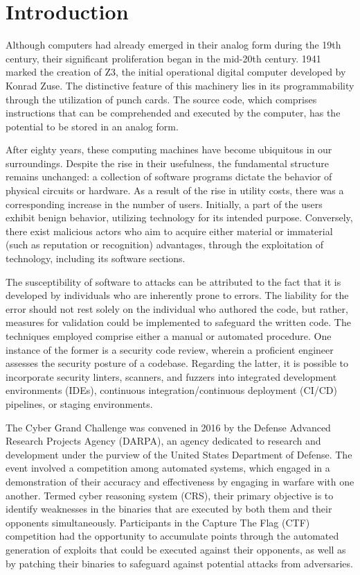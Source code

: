 \documentclass[../main.tex]{subfiles}
\begin{document}
\hypertarget{introduction}{%
\chapter{Introduction}\label{introduction}}

Although computers had already emerged in their analog form during the
19th century, their significant proliferation began in the mid-20th
century. 1941 marked the creation of Z3, the initial operational digital
computer developed by Konrad Zuse. The distinctive feature of this
machinery lies in its programmability through the utilization of punch
cards. The source code, which comprises instructions that can be
comprehended and executed by the computer, has the potential to be
stored in an analog form.

After eighty years, these computing machines have become ubiquitous in
our surroundings. Despite the rise in their usefulness, the fundamental
structure remains unchanged: a collection of software programs dictate
the behavior of physical circuits or hardware. As a result of the rise
in utility costs, there was a corresponding increase in the number of
users. Initially, a part of the users exhibit benign behavior, utilizing
technology for its intended purpose. Conversely, there exist malicious
actors who aim to acquire either material or immaterial (such as
reputation or recognition) advantages, through the exploitation of
technology, including its software sections.

The susceptibility of software to attacks can be attributed to the fact
that it is developed by individuals who are inherently prone to errors.
The liability for the error should not rest solely on the individual who
authored the code, but rather, measures for validation could be
implemented to safeguard the written code. The techniques employed
comprise either a manual or automated procedure. One instance of the
former is a security code review, wherein a proficient engineer assesses
the security posture of a codebase. Regarding the latter, it is possible
to incorporate security linters, scanners, and fuzzers into integrated
development environments (IDEs), continuous integration/continuous
deployment (CI/CD) pipelines, or staging environments.

The Cyber Grand Challenge was convened in 2016 by the Defense Advanced
Research Projects Agency (DARPA), an agency dedicated to research and
development under the purview of the United States Department of
Defense. The event involved a competition among automated systems, which
engaged in a demonstration of their accuracy and effectiveness by
engaging in warfare with one another. Termed cyber reasoning system (CRS),
their primary objective is to identify weaknesses in the binaries that
are executed by both them and their opponents simultaneously.
Participants in the Capture The Flag (CTF) competition had the opportunity to
accumulate points through the automated generation of exploits that
could be executed against their opponents, as well as by patching their
binaries to safeguard against potential attacks from adversaries.
\end{document}
